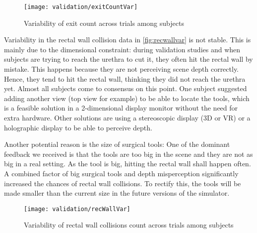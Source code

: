 \begin{figure}
  \centering
  \texttt{[image: validation/exitCountVar]}
  \caption{Variability of exit count across trials among subjects}
  \label{fig:exitvar}
\end{figure}

Variability in the rectal wall collision data in \autoref{fig:recwallvar} is not stable. This is mainly due to the dimensional constraint: during validation studies and when subjects are trying to reach the urethra to cut it, they often hit the rectal wall by mistake. This happens because they are not perceiving scene depth correctly. Hence, they tend to hit the rectal wall, thinking they did not reach the urethra yet. Almost all subjects come to consensus on this point. One subject suggested adding another view (top view for example) to be able to locate the tools, which is a feasible solution in a 2-dimensional display monitor without the need for extra hardware. Other solutions are using a stereoscopic display (3D or VR) or a holographic display to be able to perceive depth.

Another potential reason is the size of surgical tools: One of the dominant feedback we received is that the tools are too big in the scene and they are not as big in a real setting. As the tool is big, hitting the rectal wall shall happen often. A combined factor of big surgical tools and depth misperception significantly increased the chances of rectal wall collisions. To rectify this, the tools will be made smaller than the current size in the future versions of the simulator.

\begin{figure}
  \centering
  \texttt{[image: validation/recWallVar]}
  \caption{Variability of rectal wall collisions count across trials among subjects}
  \label{fig:recwallvar}
\end{figure}


